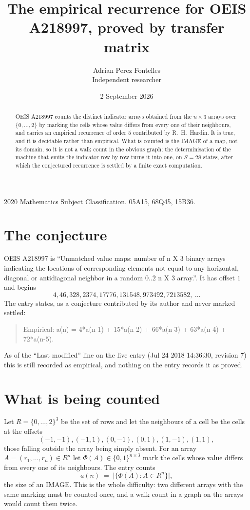 \documentclass[11pt,a4paper]{article}
\title{The empirical recurrence for OEIS A218997, proved by transfer matrix}
\author{Adrian Perez Fontelles\\ \small Independent researcher}
\date{2 September 2026}
\theoremstyle{plain}
\theoremstyle{definition}
\begin{document}
\maketitle

\begin{abstract}
OEIS A218997 counts the distinct indicator arrays obtained from the $n\times3$ arrays over
$\{0,\dots,2\}$ by marking the cells whose value differs from every one of their neighbours, and carries an
empirical recurrence of order $5$ contributed by R.~H.~Hardin. It is true, and it is
decidable rather than empirical. What is counted is the IMAGE of a map, not its domain, so it
is not a walk count in the obvious graph; the determinisation of the machine that emits the
indicator row by row turns it into one, on $S=28$ states, after which the conjectured
recurrence is settled by a finite exact computation.
\end{abstract}

\noindent\small 2020 Mathematics Subject Classification. 05A15, 68Q45, 15B36.\normalsize

\section{The conjecture}

OEIS A218997 is ``Unmatched value maps: number of n X 3 binary arrays indicating the locations of corresponding elements not equal to any horizontal, diagonal or antidiagonal neighbor in a random 0..2 n X 3 array.''. It has offset $1$ and begins
\[
4, 46, 328, 2374, 17776, 131548, 973492, 7213582,\ \dots
\]
The entry states, as a conjecture contributed by its author and never marked settled:
\begin{quote}
Empirical: a(n) = 4*a(n-1) + 15*a(n-2) + 66*a(n-3) + 63*a(n-4) + 72*a(n-5).
\end{quote}
As of the ``Last modified'' line on the live entry (Jul 24 2018 14:36:30, revision 7) this is still
recorded as empirical, and nothing on the entry records it as proved.

\section{What is being counted}

Let $R=\{0,\dots,2\}^{3}$ be the set of rows and let the neighbours of a cell be the
cells at the offsets
\[
(-1,-1), (-1,1), (0,-1), (0,1), (1,-1), (1,1),
\]
those falling outside the array being simply absent. For an array
$A=(r_1,\dots,r_n)\in R^n$ let $\Phi(A)\in\{0,1\}^{n\times3}$ mark the cells whose value
differs from every one of its neighbours. The entry counts
\[
a(n)\;=\;\bigl|\{\Phi(A):A\in R^n\}\bigr| ,
\]
the size of an IMAGE. This is the whole difficulty: two different arrays with the same marking
must be counted once, and a walk count in a graph on the arrays would count them twice.
\end{document}
